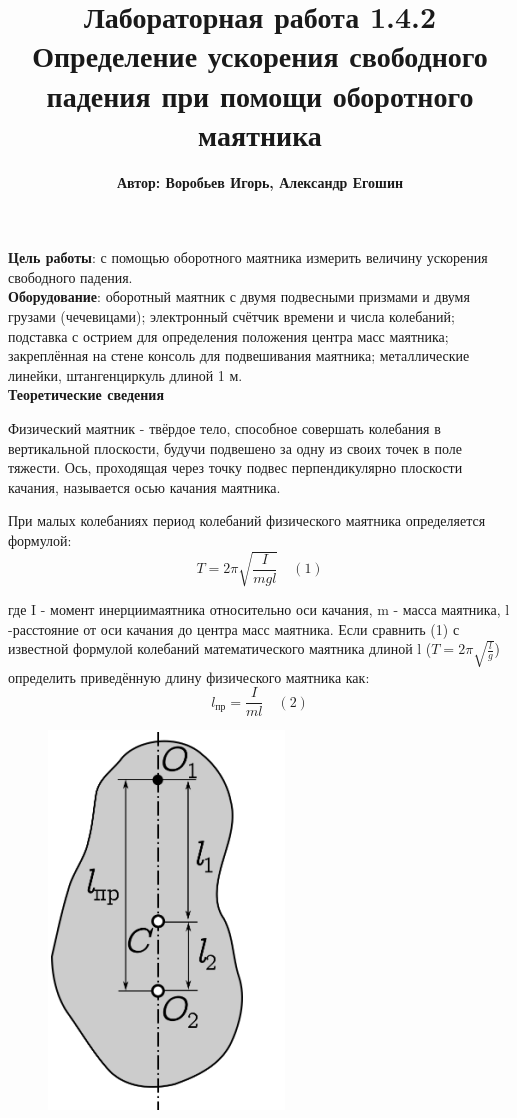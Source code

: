 \documentclass[12pt]{article}
\title{Лабораторная работа 1.4.2\\Определение ускорения свободного падения при помощи оборотного маятника}
\author{\textbf{Автор: Воробьев Игорь, Александр Егошин}}
\begin{document}
\maketitle
\textbf{Цель работы}: с помощью оборотного маятника измерить величину ускорения свободного падения.\\

\textbf{Оборудование}: оборотный маятник с двумя подвесными призмами и двумя грузами (чечевицами); электронный счётчик времени и числа колебаний; подставка с острием для определения положения центра масс маятника; закреплённая на стене консоль для подвешивания маятника; металлические линейки, штангенциркуль длиной 1 м.\\

\textbf{\large Теоретические сведения}


Физический маятник - твёрдое тело, способное совершать 
колебания в вертикальной плоскости, будучи подвешено за одну из своих 
точек в поле тяжести. Ось, проходящая через точку подвес перпендикулярно плоскости качания, называется осью качания маятника. 

При малых колебаниях период колебаний физического маятника определяется формулой: $$T = 2\pi\sqrt{\frac{I}{mgl}}\quad (1)$$


где I - момент инерциимаятника относительно оси качания, m - масса 
маятника, l -расстояние от оси качания до центра масс маятника. Если сравнить (1) с известной формулой колебаний математического 
маятника длиной l ($T = 2\pi\sqrt{\frac{l}{g}}$) определить приведённую длину физического маятника как: $$l_{\text{пр}} = \frac{I}{ml} \quad (2)$$

\begin{figure}[h!]
    \centering
    \includegraphics{Рис.1.png}
\end{figure}
\end{document}
